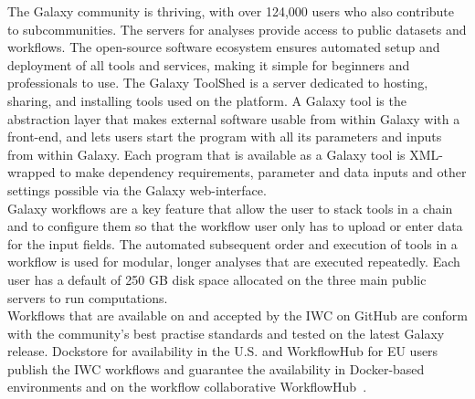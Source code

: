 The Galaxy community is thriving, with over 124,000 users who also contribute to subcommunities. The servers for analyses provide access to public datasets and workflows. The open-source software ecosystem ensures automated setup and deployment of all tools and services, making it simple for beginners and professionals to use. The Galaxy ToolShed is a server dedicated to hosting, sharing, and installing tools used on the platform. A Galaxy tool is the abstraction layer that makes external software usable from within Galaxy with a front-end, and lets users start the program with all its parameters and inputs from within Galaxy. Each program that is available as a Galaxy tool is XML-wrapped to make dependency requirements, parameter and data inputs and other settings possible via the Galaxy web-interface. \\ 
Galaxy workflows are a key feature that allow the user to stack tools in a chain and to configure them so that the workflow user only has to upload or enter data for the input fields. The automated subsequent order and execution of tools in a workflow is used for modular, longer analyses that are executed repeatedly. Each user has a default of 250 GB disk space allocated on the three main public servers to run computations. \\
Workflows that are available on and accepted by the \ac{IWC} on GitHub are conform with the community's best practise standards and tested on the latest Galaxy release. Dockstore for availability in the U.S. and WorkflowHub for EU users publish the \ac{IWC} workflows and guarantee the availability in Docker-based environments and on the workflow collaborative WorkflowHub~\cite{o2017dockstore, goble2021implementing}.

